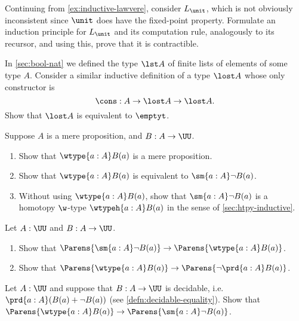 \begin{ex}\label{ex:ilunit}
  Continuing from \cref{ex:inductive-lawvere}, consider $L_\unit$, which is not obviously inconsistent since $\unit$ does have the fixed-point property.
  Formulate an induction principle for $L_\unit$ and its computation rule, analogously to its recursor, and using this, prove that it is contractible.
\end{ex}

\begin{ex}\label{ex:empty-inductive-type}
In \cref{sec:bool-nat} we defined the type $\lst A$ of finite lists of elements of some type $A$.
Consider a similar inductive definition of a type $\lost A$ whose only constructor is
\[ \cons: A \to \lost A \to \lost A. \]
Show that $\lost A$ is equivalent to $\emptyt$.
\end{ex}

\begin{ex}\label{ex:Wprop}
  Suppose $A$ is a mere proposition, and $B:A\to \UU$.
  \begin{enumerate}
  \item Show that $\wtype{a:A} B(a)$ is a mere proposition.
  \item Show that $\wtype{a:A} B(a)$ is equivalent to $\sm{a:A} \neg B(a)$.
  \item Without using $\wtype{a:A} B(a)$, show that $\sm{a:A} \neg B(a)$ is a homotopy $\w$-type $\wtypeh{a:A} B(a)$ in the sense of \cref{sec:htpy-inductive}.
  \end{enumerate}
\end{ex}

\begin{ex}\label{ex:Wbounds}
  Let $A:\UU$ and $B:A\to \UU$.
  \begin{enumerate}
  \item Show that $\Parens{\sm{a:A} \neg B(a)} \to \Parens{\wtype{a:A} B(a)}$.
  \item Show that $\Parens{\wtype{a:A} B(a)} \to \Parens{\neg \prd{a:A} B(a)}$.
  \end{enumerate}
\end{ex}

\begin{ex}\label{ex:Wdec}
  Let $A:\UU$ and suppose that $B:A\to \UU$ is decidable, i.e.\ $\prd{a:A} (B(a)+\neg B(a))$ (see \cref{defn:decidable-equality}).
  Show that $\Parens{\wtype{a:A} B(a)} \to \Parens{\sm{a:A} \neg B(a)}$.
\end{ex}

